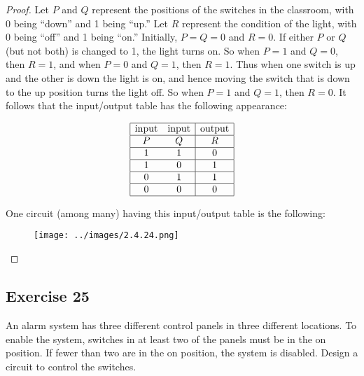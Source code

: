 \documentclass[14pt]{extarticle}
\begin{document}
\begin{proof}
    Let $P$ and $Q$ represent the positions of the switches in the classroom, with 0 being “down” and 1 being “up.” Let $R$ represent the condition of the light, with 0 being “off” and 1 being “on.” Initially, $P = Q = 0$ and $R = 0$. If either $P$ or $Q$ (but not both) is changed to 1, the light turns on. So when $P = 1$ and $Q = 0$, then $R = 1$, and when $P = 0$ and $Q = 1$, then $R = 1$. Thus when one switch is up and the other is down the light is on, and hence moving the switch that is down to the up position turns the light off. So when $P = 1$ and $Q = 1$, then $R = 0$. It follows that the input/output table has the following appearance:

    $$
        \begin{array}{|cc|c|} \hline \text{input} & \text{input} & \text{output} \\
             \hline
             P                            & Q            & R             \\
             \hline
             1                            & 1            & 0             \\
             \hline
             1                            & 0            & 1             \\
             \hline
             0                            & 1            & 1             \\
             \hline
             0                            & 0            & 0             \\
             \hline
        \end{array}
    $$

    One circuit (among many) having this input/output table is the following:

    \begin{figure}[ht!]
        \centering
        \texttt{[image: ../images/2.4.24.png]}
    \end{figure}
\end{proof}

\subsection{Exercise 25}
An alarm system has three different control panels in three different locations. To enable the system, switches in at least two of the panels must be in the on position. If fewer than two are in the on position, the system is disabled. Design a circuit to control the switches.
\end{document}
